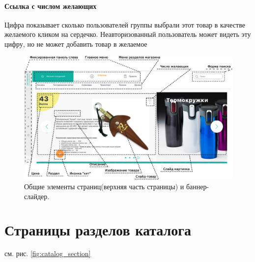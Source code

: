                 \paragraph{Ссылка с числом желающих}
                    Цифра показывает сколько пользователей группы 
                     выбрали этот товар в качестве желаемого 
                    кликом на сердечко. Неавторизованный пользователь может видеть
                    эту цифру, но не может добавить товар в желаемое
            
        \begin{figure}
            \includegraphics[width=170mm]{02_noauth_funcs/figures/01r.eps}
            \caption{Общие элементы страниц(верхняя часть страницы) и баннер-слайдер.}
            \label{fig:common_items_1}
        \end{figure}


    \section{Страницы разделов каталога}
        \label{sec:page_catalog_section}
        
        см. рис. \ref{fig:catalog_section}
        
